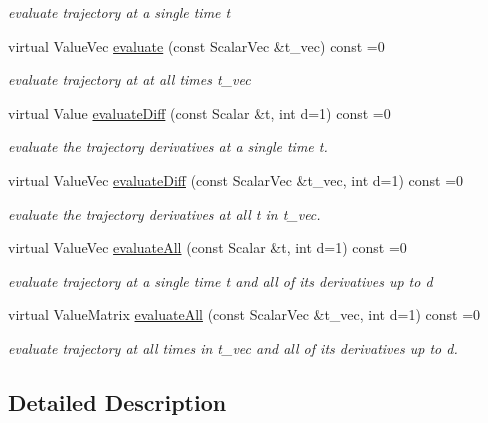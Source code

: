 \begin{DoxyCompactItemize}
\begin{DoxyCompactList}\small\item\em evaluate trajectory at a single time t \end{DoxyCompactList}\item 
virtual Value\+Vec \hyperlink{classow__core_1_1ITrajectory_a81e6e2ea5cc3363595e9ac86c148b93c}{evaluate} (const Scalar\+Vec \&t\+\_\+vec) const =0
\begin{DoxyCompactList}\small\item\em evaluate trajectory at at all times t\+\_\+vec \end{DoxyCompactList}\item 
virtual Value \hyperlink{classow__core_1_1ITrajectory_af7a00745433afb4d5b0cb777d49d1d6e}{evaluate\+Diff} (const Scalar \&t, int d=1) const =0
\begin{DoxyCompactList}\small\item\em evaluate the trajectory derivatives at a single time t. \end{DoxyCompactList}\item 
virtual Value\+Vec \hyperlink{classow__core_1_1ITrajectory_a5defcd9c0a3909afc5ef59e331344e59}{evaluate\+Diff} (const Scalar\+Vec \&t\+\_\+vec, int d=1) const =0
\begin{DoxyCompactList}\small\item\em evaluate the trajectory derivatives at all t in t\+\_\+vec. \end{DoxyCompactList}\item 
virtual Value\+Vec \hyperlink{classow__core_1_1ITrajectory_a35c4a7c65bbeab0d7c429bc51ddf6e71}{evaluate\+All} (const Scalar \&t, int d=1) const =0
\begin{DoxyCompactList}\small\item\em evaluate trajectory at a single time t and all of its derivatives up to d \end{DoxyCompactList}\item 
virtual Value\+Matrix \hyperlink{classow__core_1_1ITrajectory_a91a535d6165d287aa73b682085f194a6}{evaluate\+All} (const Scalar\+Vec \&t\+\_\+vec, int d=1) const =0
\begin{DoxyCompactList}\small\item\em evaluate trajectory at all times in t\+\_\+vec and all of its derivatives up to d. \end{DoxyCompactList}\end{DoxyCompactItemize}


\subsection{Detailed Description}
